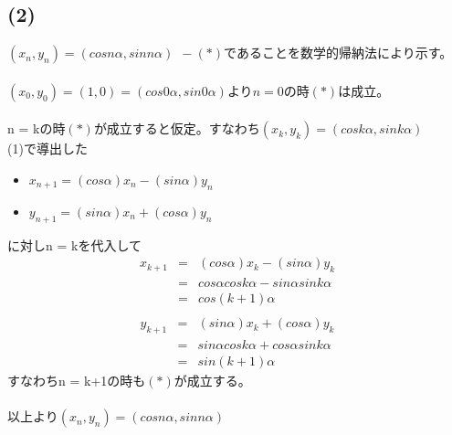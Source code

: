 \documentclass[a4j, 11pt]{jarticle}
\begin{document}
%
%






%
%







%
%

	\subsection*{(2)}
		$(x_n,y_n) = (cos n \alpha,sin n \alpha) \ \ -(*)$であることを数学的帰納法により示す。
		\paragraph{}
			$(x_0,y_0) = (1,0) = (cos0 \alpha,sin0 \alpha)$より$n =0$の時$(*)$は成立。
		\paragraph{}
			n = kの時$(*)$が成立すると仮定。すなわち$(x_k,y_k) = (cos k\alpha,sin k \alpha)$ \\
			(1)で導出した
				\begin{itemize}
					\item $x_{n+1} = (cos\alpha)x_n - (sin\alpha)y_n$
					\item $y_{n+1} = (sin\alpha)x_n + (cos \alpha)y_n$
				\end{itemize}
			に対しn = kを代入して
				\begin{eqnarray*}
					x_{k+1} &=&  (cos\alpha)x_k - (sin\alpha)y_k \\
							&=&cos\alpha cosk\alpha - sin\alpha sink\alpha \\ &=& 
							cos(k + 1)\alpha \\
				\end{eqnarray*}
				\begin{eqnarray*}
					y_{k+1} &=& (sin\alpha)x_k + (cos \alpha)y_k \\
						&=& sin\alpha cosk\alpha + cos\alpha sink \alpha \\
						&=& sin(k + 1)\alpha
				\end{eqnarray*}
			すなわちn = k+1の時も$(*)$が成立する。
			
		\paragraph{}
		以上より$(x_n,y_n) = (cosn\alpha,sinn\alpha)$			

%
%






%
%





%
%






%
%
\end{document}
